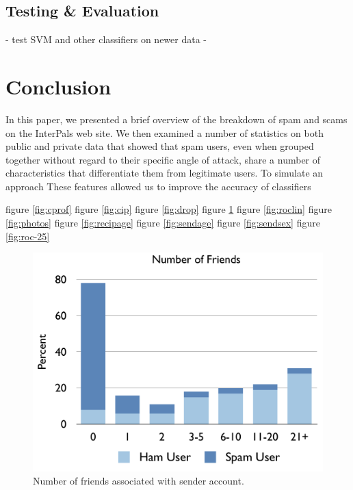 \documentclass[preprint]{acm_proc_article-sp}
\begin{document}
\subsection{Testing \& Evaluation}

- test SVM and other classifiers on newer data
- 

\section{Conclusion}

In this paper, we presented a brief overview of the breakdown of spam and scams on the InterPals web site. 
We then examined a number of statistics on both public and private data that showed that spam users, even when 
grouped together without regard to their specific angle of attack, share a number of characteristics that differentiate 
them from legitimate users. To simulate an approach 
These features allowed us to improve the accuracy of classifiers



figure \ref{fig:cprof}
figure \ref{fig:cip}
figure \ref{fig:drop}
figure \ref{fig:friends}
figure \ref{fig:roclin}
figure \ref{fig:photos}
figure \ref{fig:recipage}
figure \ref{fig:sendage}
figure \ref{fig:sendsex}
figure \ref{fig:roc-25}

\begin{figure}[h]
    \centering
    \includegraphics[width=\linewidth]{figures/friends.pdf}
    \caption{Number of friends associated with sender account.}
    \label{fig:friends}
\end{figure}
\end{document}
